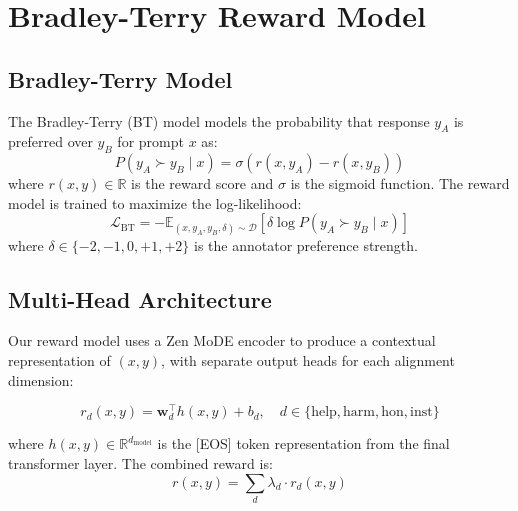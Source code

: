 \documentclass[11pt,a4paper]{article}
\begin{document}
\section{Bradley-Terry Reward Model}
\label{sec:reward_model}

\subsection{Bradley-Terry Model}

The Bradley-Terry (BT) model \cite{bradley1952rank} models the probability that response
$y_A$ is preferred over $y_B$ for prompt $x$ as:
\begin{equation}
    P(y_A \succ y_B \mid x) = \sigma(r(x, y_A) - r(x, y_B))
    \label{eq:bt}
\end{equation}
where $r(x, y) \in \mathbb{R}$ is the reward score and $\sigma$ is the sigmoid function.
The reward model is trained to maximize the log-likelihood:
\begin{equation}
    \mathcal{L}_{\text{BT}} = -\mathbb{E}_{(x, y_A, y_B, \delta) \sim \mathcal{D}}\!\left[
    \delta \log P(y_A \succ y_B \mid x)\right]
    \label{eq:bt_loss}
\end{equation}
where $\delta \in \{-2, -1, 0, +1, +2\}$ is the annotator preference strength.

\subsection{Multi-Head Architecture}

Our reward model uses a Zen MoDE encoder to produce a contextual representation of
$(x, y)$, with separate output heads for each alignment dimension:

\begin{equation}
    r_d(x, y) = \mathbf{w}_d^\top h(x, y) + b_d, \quad
    d \in \{\text{help}, \text{harm}, \text{hon}, \text{inst}\}
    \label{eq:multi_head}
\end{equation}

where $h(x, y) \in \mathbb{R}^{d_{\text{model}}}$ is the [EOS] token representation
from the final transformer layer. The combined reward is:
\begin{equation}
    r(x, y) = \sum_d \lambda_d \cdot r_d(x, y)
    \label{eq:combined}
\end{equation}
\end{document}
